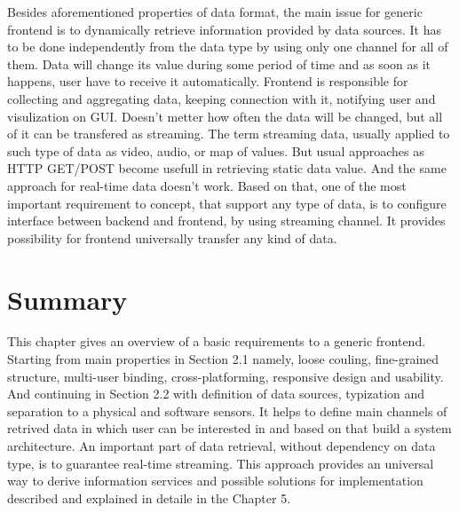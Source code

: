 	Besides aforementioned properties of data format, the main issue for generic frontend is to dynamically retrieve information provided by data sources. It has to be done independently from the data type by using only one channel for all of them. Data will change its value during some period of time and as soon as it happens, user have to receive it automatically. Frontend is responsible for collecting and aggregating data, keeping connection with it, notifying user and visulization on GUI. Doesn't metter how often the data will be changed, but all of it can be transfered as streaming. The term streaming data, usually applied to such type of data as video, audio, or map of values. But usual approaches as HTTP GET/POST become usefull in retrieving static data value. And the same approach for real-time data doesn't work. Based on that, one of the most important requirement to concept, that support any type of data, is to configure interface between backend and frontend, by using streaming channel. It provides possibility for frontend universally transfer any kind of data.


\section{Summary}
	This chapter gives an overview of a basic requirements to a generic frontend. Starting from main properties in Section 2.1 namely, loose couling, fine-grained structure, multi-user binding, cross-platforming, responsive design and usability. And continuing in Section 2.2 with definition of data sources, typization and separation to a physical and software sensors. It helps to define main channels of retrived data in which user can be interested in and based on that build a system architecture. An important part of data retrieval, without dependency on data type, is to guarantee real-time streaming. This approach provides an universal way to derive information services and possible solutions for implementation described and explained in detaile in the Chapter 5.
